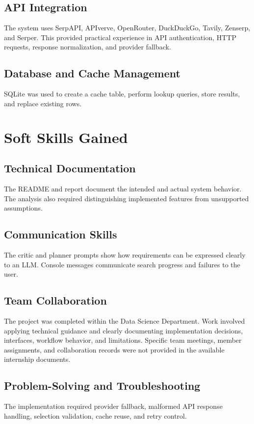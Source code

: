\documentclass[12pt,a4paper]{report}
\begin{document}
\subsection{API Integration}
\label{subsec:api-integration}
The system uses SerpAPI, APIverve, OpenRouter, DuckDuckGo, Tavily, Zenserp, and Serper.
This provided practical experience in API authentication, HTTP requests, response normalization,
and provider fallback.

\subsection{Database and Cache Management}
\label{subsec:database-cache-management}
SQLite was used to create a cache table, perform lookup queries, store results, and replace
existing rows.

\section{Soft Skills Gained}
\label{sec:soft-skills-gained}

\subsection{Technical Documentation}
\label{subsec:technical-documentation}
The README and report document the intended and actual system behavior. The analysis also
required distinguishing implemented features from unsupported assumptions.

\subsection{Communication Skills}
\label{subsec:communication-skills}
The critic and planner prompts show how requirements can be expressed clearly to an LLM.
Console messages communicate search progress and failures to the user.

\subsection{Team Collaboration}
\label{subsec:team-collaboration}
The project was completed within the Data Science Department. Work involved applying technical
guidance and clearly documenting implementation decisions, interfaces, workflow behavior, and
limitations. Specific team meetings, member assignments, and collaboration records were not
provided in the available internship documents.

\subsection{Problem-Solving and Troubleshooting}
\label{subsec:problem-solving}
The implementation required provider fallback, malformed API response handling, selection
validation, cache reuse, and retry control.
\end{document}
